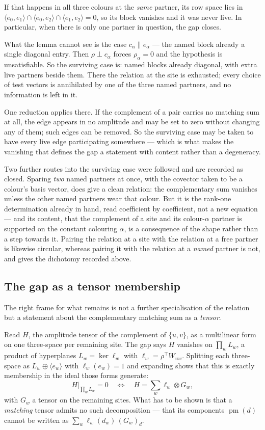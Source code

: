 \documentclass[11pt]{article}
\theoremstyle{definition}
\theoremstyle{remark}
\begin{document}
If that happens in all three colours at the \emph{same} partner, its row space lies in
$\langle e_0,e_1\rangle \cap \langle e_0,e_2\rangle \cap \langle e_1,e_2\rangle = 0$, so
its block vanishes and it was never live. In particular, when there is only one partner
in question, the gap closes.

What the lemma cannot see is the case $c_\alpha \parallel e_\alpha$ --- the named block
already a single diagonal entry. Then $\rho \perp c_\alpha$ forces $\rho_\alpha = 0$ and
the hypothesis is unsatisfiable. So the surviving case is: named blocks already diagonal,
with extra live partners beside them. There the relation at the site is exhausted; every
choice of test vectors is annihilated by one of the three named partners, and no
information is left in it.

One reduction applies there. If the complement of a pair carries no matching sum at all,
the edge appears in no amplitude and may be set to zero without changing any of them; such
edges can be removed. So the surviving case may be taken to have every live edge
participating somewhere --- which is what makes the vanishing that defines the gap a
statement with content rather than a degeneracy.

Two further routes into the surviving case were followed and are recorded as closed.
Sparing \emph{two} named partners at once, with the covector taken to be a colour's basis
vector, does give a clean relation: the complementary sum vanishes unless the other named
partners wear that colour. But it is the rank-one determination already in hand, read
coefficient by coefficient, not a new equation --- and its content, that the complement of
a site and its colour-$\alpha$ partner is supported on the constant colouring $\alpha$,
is a consequence of the shape rather than a step towards it. Pairing the relation at a
site with the relation at a free partner is likewise circular, whereas pairing it with the
relation at a \emph{named} partner is not, and gives the dichotomy recorded above.

\subsection*{The gap as a tensor membership}

The right frame for what remains is not a further specialisation of the relation but a
statement about the complementary matching sum as a \emph{tensor}.

Read $H$, the amplitude tensor of the complement of $\{u,v\}$, as a multilinear form on
one three-space per remaining site. The gap says $H$ vanishes on $\prod_w L_w$, a product
of hyperplanes $L_w = \ker \ell_w$ with $\ell_w = \rho^{\!\top}W_{uw}$. Splitting each
three-space as $L_w \oplus \langle e_w\rangle$ with $\ell_w(e_w) = 1$ and expanding shows
that this is exactly membership in the ideal those forms generate:
\[
  H\big|_{\prod_w L_w} = 0
  \quad\Longleftrightarrow\quad
  H = \sum_{w} \ell_w \otimes G_w ,
\]
with $G_w$ a tensor on the remaining sites. What has to be shown is that a \emph{matching}
tensor admits no such decomposition --- that its components $\operatorname{pm}(d)$ cannot
be written as $\sum_w \ell_w(d_w)\,(G_w)_{d}$.
\end{document}
